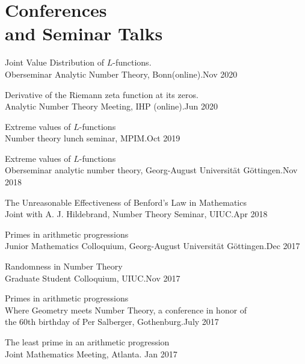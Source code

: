 \documentclass[margin,line,pifont,palatino,courier]{res}
\newenvironment{list1}{
  \begin{list}{\ding{113}}{%
      \setlength{\itemsep}{0in}
      \setlength{\parsep}{0in} \setlength{\parskip}{0in}
      \setlength{\topsep}{0in} \setlength{\partopsep}{0in}
      \setlength{\leftmargin}{0.17in}}}{\end{list}}
\begin{document}
\begin{resume}
\begin{list1}
\end{list1}

\section{\sc Conferences\\ and Seminar Talks}
\begin{list1}
\item{ Joint Value Distribution of $L$-functions.} \\{Oberseminar Analytic Number Theory, Bonn(online)}.{\hfill Nov 2020}
\item{ Derivative of the Riemann zeta function at its zeros.} \\{Analytic Number Theory Meeting, IHP (online)}.{\hfill Jun 2020}

\item{Extreme values of $L$-functions} \\{ Number theory lunch seminar, MPIM}.{\hfill Oct 2019}

\item{Extreme values of $L$-functions} \\{Oberseminar analytic number theory, Georg-August Universit\"at G\"ottingen}.{\hfill Nov 2018}
 
 \item{The Unreasonable Effectiveness of Benford's Law in Mathematics}\\Joint with A. J. Hildebrand, Number Theory Seminar, UIUC.{\hfill Apr 2018}
 
\item{Primes in arithmetic progressions} \\{Junior Mathematics Colloquium, Georg-August Universit\"at G\"ottingen}.{\hfill Dec 2017}

\item{Randomness in Number Theory} \\{Graduate Student Colloquium, UIUC}.{\hfill Nov 2017}


\item{Primes in arithmetic progressions} \\{Where Geometry meets Number Theory, a conference in honor of \\the 60th birthday of Per Salberger, Gothenburg}.{\hfill July 2017}
	
 	\item{The least prime in an arithmetic progression} \\
	Joint Mathematics Meeting, Atlanta. {\hfill Jan 2017}


\end{list1}
\end{resume}
\end{document}
